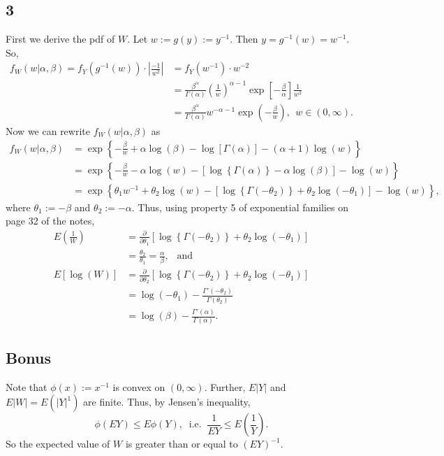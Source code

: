 \documentclass[12pt]{article}
\begin{document}
\subsection*{3}
First we derive the pdf of $W$. Let $w := g(y) := y^{-1}$. Then $y = g^{-1}(w) = w^{-1}$. So,
\begin{align*}
  f_{W}(w|\alpha,\beta) = f_{Y}(g^{-1}(w))\cdot \left| \frac{-1}{w^{2}} \right| & = f_{Y}(w^{-1})\cdot w^{-2} \\
  & = \frac{\beta^{\alpha}}{\Gamma(\alpha)}\left( \frac{1}{w} \right)^{\alpha - 1}\exp\left[ -\frac{\beta}{\alpha} \right]\frac{1}{w^{2}} \\
  & = \frac{\beta^{\alpha}}{\Gamma(\alpha)}w^{-\alpha - 1}\exp\left( -\frac{\beta}{w} \right), \ \ w \in (0, \infty).
\end{align*}
Now we can rewrite $f_{W}(w|\alpha,\beta)$ as 
\begin{align*}
  f_{W}(w|\alpha,\beta) & = \exp\left\{ -\frac{\beta}{w} + \alpha\log(\beta) - \log\left[ \Gamma(\alpha) \right] - (\alpha + 1)\log(w) \right\} \\
  & = \exp\left\{ -\frac{\beta}{w} - \alpha\log(w) - \left[ \log\left\{ \Gamma(\alpha) \right\} - \alpha\log(\beta) \right] - \log(w) \right\} \\
  & = \exp\left\{ \theta_1 w^{-1} + \theta_2\log(w) - \left[ \log\left\{ \Gamma(-\theta_2) \right\} + \theta_2\log(-\theta_1) \right] - \log(w) \right\},
\end{align*}
where $\theta_1 := -\beta$ and $\theta_2 := -\alpha$. Thus, using property 5 of exponential families on page 32 of the notes,
\begin{align*}
  E\left( \frac{1}{W} \right) & = \frac{\partial}{\partial \theta_1}\left[ \log\left\{ \Gamma(-\theta_2) \right\} + \theta_2\log(-\theta_1) \right] \\
  & = \frac{\theta_2}{\theta_1} = \frac{\alpha}{\beta}, \ \ \text{ and } \\
  E\left[ \log(W) \right] & =  \frac{\partial}{\partial \theta_2}\left[ \log\left\{ \Gamma(-\theta_2) \right\} + \theta_2\log(-\theta_1) \right] \\
  & = \log(-\theta_1) - \frac{\Gamma'(-\theta_2)}{\Gamma(\theta_2)} \\
  & = \log(\beta) - \frac{\Gamma'(\alpha)}{\Gamma(\alpha)}.
\end{align*}


\subsection*{Bonus}
Note that $\phi(x) := x^{-1}$ is convex on $(0,\infty)$. Further, $E|Y|$ and $E|W| = E(|Y|^{1})$ are finite. Thus, by Jensen's inequality,
\[
  \phi\left( EY \right) \leq E\phi(Y), \ \text{ i.e. } \ \frac{1}{EY} \leq E\left( \frac{1}{Y} \right).
\]
So the expected value of $W$ is greater than or equal to $(EY)^{-1}$.
\end{document}
